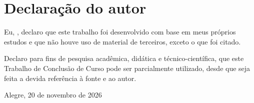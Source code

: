 \chapter*{Declaração do autor}

Eu, \textbf{\imprimirautor}, declaro que este trabalho foi desenvolvido com base em meus próprios estudos e que não houve uso de material de terceiros, exceto o que foi citado.

\vspace{4cm}

\noindent
Declaro para fins de pesquisa acadêmica, didática e técnico-científica, que este Trabalho de Conclusão de Curso pode ser parcialmente utilizado, desde que seja feita a devida referência à fonte e ao autor.


\begin{center}
Alegre, 20 de novembro de 2026
\end{center}

\vspace{2.0cm}

\begin{center}
\imprimirautor
\end{center}

\clearpage
